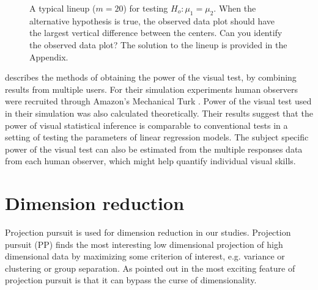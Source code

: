 \begin{figure}[hbtp]
   \centering
      \caption{A typical lineup  ($m = 20$) for testing $H_o: \mu_1 =  \mu_2$. 
      When the alternative hypothesis is true, the observed data plot should have the largest vertical difference between the centers. Can you identify the observed data plot? The solution to the lineup is provided in the Appendix.}
      \label{lineup}
\end{figure}

\cite{majumder:2013} describes the methods of obtaining the power of the visual test, by combining results from multiple users. For their simulation experiments human observers were recruited through Amazon's Mechanical Turk \citep{turk}. Power of the visual test used in their simulation was also calculated theoretically. Their results suggest that the power of visual statistical inference is comparable to conventional tests in a setting of testing the parameters of linear regression models. The subject specific power of the visual test can also be estimated from the multiple responses data from each human observer, which might help quantify individual visual skills.

 
\section{Dimension reduction}  \label{sec:dimred}

Projection pursuit \citep[e.g.][]{friedman:1974}  is used for dimension reduction in our studies. Projection pursuit (PP) finds the most interesting low dimensional projection of high dimensional data by maximizing some criterion of interest, e.g. variance or clustering or group separation. As pointed out in \cite{huber:1985} the most exciting feature of projection pursuit is that it can bypass the curse of dimensionality. 

